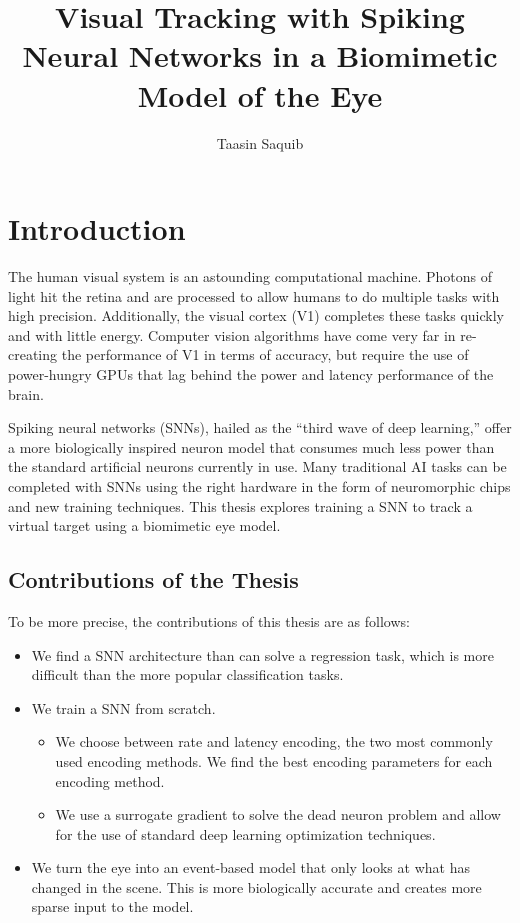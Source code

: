 \documentclass [MS] {UCLAthesis}
\title          {Visual Tracking with Spiking Neural Networks in a Biomimetic Model of the Eye}
\author         {Taasin Saquib}
\begin{document}
\makeintropages


\chapter{Introduction}

The human visual system is an astounding computational machine. Photons of light hit the retina and are processed to allow humans to do multiple tasks with high precision. Additionally, the visual cortex (V1) completes these tasks quickly and with little energy. Computer vision algorithms have come very far in re-creating the performance of V1 in terms of accuracy, but require the use of power-hungry GPUs that lag behind the power and latency performance of the brain.

Spiking neural networks (SNNs), hailed as the “third wave of deep learning,” offer a more biologically inspired neuron model that consumes much less power than the standard artificial neurons currently in use. Many traditional AI tasks can be completed with SNNs using the right hardware in the form of neuromorphic chips and new training techniques. This thesis explores training a SNN to track a virtual target using a biomimetic eye model.


\section{Contributions of the Thesis}

To be more precise, the contributions of this thesis are as follows:

\begin{itemize}
    \item We find a SNN architecture than can solve a regression task, which is more difficult than the more popular classification tasks.
  \item We train a SNN from scratch.
  \begin{itemize}
    \item We choose between rate and latency encoding, the two most commonly used encoding methods. We find the best encoding parameters for each encoding method.
    \item We use a surrogate gradient to solve the dead neuron problem and allow for the use of standard deep learning optimization techniques.
  \end{itemize}
  \item We turn the eye into an event-based model that only looks at what has changed in the scene. This is more biologically accurate and creates more sparse input to the model.
\end{itemize}
\end{document}
